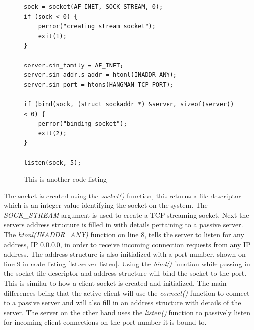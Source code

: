 \documentclass[12pt,a4paper,titlepage]{article}
\begin{document}
\begin{figure}[H]

\begin{lstlisting}
sock = socket(AF_INET, SOCK_STREAM, 0); 
if (sock < 0) {
	perror("creating stream socket");
	exit(1);
}

server.sin_family = AF_INET;
server.sin_addr.s_addr = htonl(INADDR_ANY);
server.sin_port = htons(HANGMAN_TCP_PORT);

if (bind(sock, (struct sockaddr *) &server, sizeof(server)) < 0) {
	perror("binding socket");
	exit(2);
}

listen(sock, 5);
\end{lstlisting}
	\caption{This is another code listing \cite{stevensunp}}
	\label{code:raig header source}
\end{figure}

The socket is created using the \textit{socket()} function, this returns a file descriptor which is an integer value identifying the socket on the system. The \textit{SOCK\_STREAM} argument is used to create a TCP streaming socket. Next the servers address structure is filled in with details pertaining to a passive server. The \textit{htonl(INADDR\_ANY)} function on line 8, tells the server to listen for any address, IP 0.0.0.0, in order to receive incoming connection requests from any IP address. The address structure is also initialized with a port number, shown on line 9 in code listing \ref{lst:server listen}. Using the \textit{bind()} function while passing in the socket file descriptor and address structure will bind the socket to the port.\\ 

This is similar to how a client socket is created and initialized. The main differences being that the active client will use the \textit{connect()} function to connect to a passive server and will also fill in an address structure with details of the server. The server on the other hand uses the \textit{listen()} function to passively listen for incoming client connections on the port number it is bound to. \\
\end{document}
